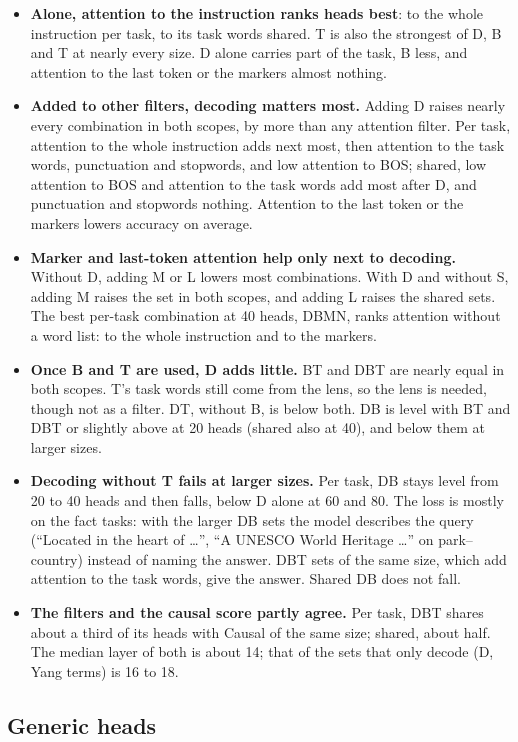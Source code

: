 \documentclass[10pt,a4paper]{article}
\begin{document}
\begin{itemize}
\item \textbf{Alone, attention to the instruction ranks heads best}: to the whole instruction per task, to its task words shared. T is also the strongest of D, B and T at nearly every size. D alone carries part of the task, B less, and attention to the last token or the markers almost nothing.
\item \textbf{Added to other filters, decoding matters most.} Adding D raises nearly every combination in both scopes, by more than any attention filter. Per task, attention to the whole instruction adds next most, then attention to the task words, punctuation and stopwords, and low attention to BOS; shared, low attention to BOS and attention to the task words add most after D, and punctuation and stopwords nothing. Attention to the last token or the markers lowers accuracy on average.
\item \textbf{Marker and last-token attention help only next to decoding.} Without D, adding M or L lowers most combinations. With D and without S, adding M raises the set in both scopes, and adding L raises the shared sets. The best per-task combination at 40 heads, DBMN, ranks attention without a word list: to the whole instruction and to the markers.
\item \textbf{Once B and T are used, D adds little.} BT and DBT are nearly equal in both scopes. T's task words still come from the lens, so the lens is needed, though not as a filter. DT, without B, is below both. DB is level with BT and DBT or slightly above at 20 heads (shared also at 40), and below them at larger sizes.
\item \textbf{Decoding without T fails at larger sizes.} Per task, DB stays level from 20 to 40 heads and then falls, below D alone at 60 and 80. The loss is mostly on the fact tasks: with the larger DB sets the model describes the query (``Located in the heart of \dots'', ``A UNESCO World Heritage \dots'' on park--country) instead of naming the answer. DBT sets of the same size, which add attention to the task words, give the answer. Shared DB does not fall.
\item \textbf{The filters and the causal score partly agree.} Per task, DBT shares about a third of its heads with Causal of the same size; shared, about half. The median layer of both is about 14; that of the sets that only decode (D, Yang terms) is 16 to 18.
\end{itemize}

\subsection{Generic heads}
\end{document}
